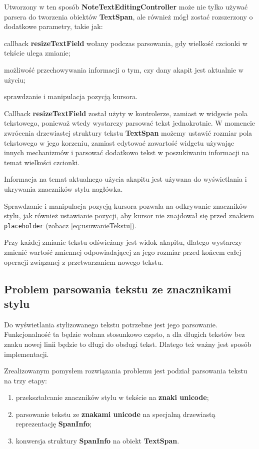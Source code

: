 Utworzony w ten sposób \textbf{NoteTextEditingController} może nie tylko używać parsera do tworzenia obiektów \textbf{TextSpan}, ale również mógł zostać rozszerzony o dodatkowe parametry, takie jak:

\begin{compactitem}
    \item callback \textbf{resizeTextField} wołany podczas parsowania, gdy wielkość czcionki w tekście ulega zmianie;
    \item możliwość przechowywania informacji o tym, czy dany akapit jest aktualnie w użyciu;
    \item sprawdzanie i manipulacja pozycją kursora.
\end{compactitem}

Callback \textbf{resizeTextField} został użyty w kontrolerze, zamiast w widgecie pola tekstowego, ponieważ wtedy wystarczy parsować tekst jednokrotnie. W momencie zwrócenia drzewiastej struktury tekstu \textbf{TextSpan} możemy ustawić rozmiar pola tekstowego w jego korzeniu, zamiast edytować zawartość widgetu używając innych mechanizmów i parsować dodatkowo tekst w poszukiwaniu informacji na temat wielkości czcionki.

Informacja na temat aktualnego użycia akapitu jest używana do wyświetlania i ukrywania znaczników stylu nagłówka.

Sprawdzanie i manipulacja pozycją kursora pozwala na odkrywanie znaczników stylu, jak również ustawianie pozycji, aby kursor nie znajdował się przed znakiem \verb|placeholder| (zobacz \ref{eq:usuwanieTekstu}).

Przy każdej zmianie tekstu odświeżany jest widok akapitu, dlatego wystarczy zmienić wartość zmiennej odpowiadającej za jego rozmiar przed końcem całej operacji związanej z przetwarzaniem nowego tekstu.

\subsection{Problem parsowania tekstu ze znacznikami stylu}

Do wyświetlania stylizowanego tekstu potrzebne jest jego parsowanie. Funkcjonalność ta będzie wołana stosunkowo często, a dla długich tekstów bez znaku nowej linii będzie to długi do obsługi tekst. Dlatego też ważny jest sposób implementacji.

Zrealizowanym pomysłem rozwiązania problemu jest podział parsowania tekstu na trzy etapy:
\begin{enumerate}
    \setlength\itemsep{0mm}
    \item przekształcanie znaczników stylu w tekście na \textbf{znaki unicode};
    \item parsowanie tekstu ze \textbf{znakami unicode} na specjalną drzewiastą reprezentację \textbf{SpanInfo};
    \item konwersja struktury \textbf{SpanInfo} na obiekt \textbf{TextSpan}.
\end{enumerate}

